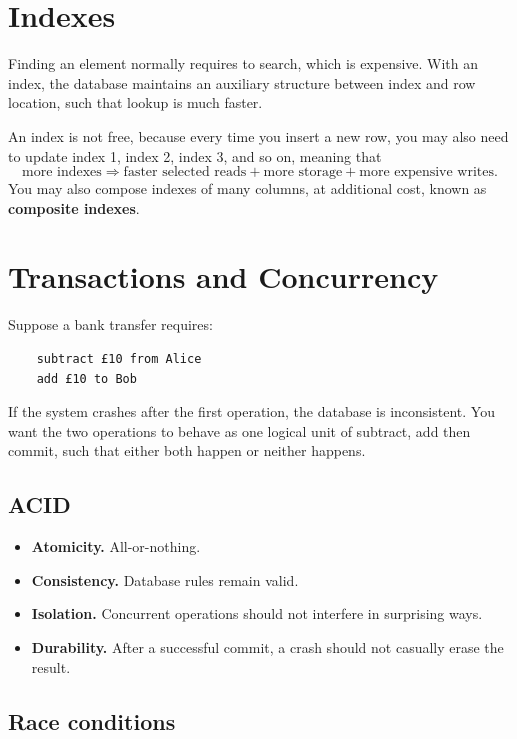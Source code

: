 \section{Indexes}
\label{sec:database-indexes}

Finding an element normally requires to search, which is expensive.
With an index, the database maintains an auxiliary structure between index and row location, such that lookup is much faster.

An index is not free, because every time you insert a new row, you may also need to update index 1, index 2, index 3, and so on, meaning that
\[
\text{more indexes}
\Rightarrow
\text{faster selected reads}
+
\text{more storage}
+
\text{more expensive writes}
.
\]
You may also compose indexes of many columns, at additional cost, known as \textbf{composite indexes}.

\section{Transactions and Concurrency}
\label{sec:transactions-concurrency}
Suppose a bank transfer requires:
\begin{verbatim}
    subtract £10 from Alice
    add £10 to Bob
\end{verbatim}
If the system crashes after the first operation, the database is inconsistent.
You want the two operations to behave as one logical unit of subtract, add then commit, such that either both happen or neither happens.

\subsection{ACID}
\begin{itemize}
    \item \textbf{Atomicity.} All-or-nothing.
    \item \textbf{Consistency.} Database rules remain valid.
    \item \textbf{Isolation.} Concurrent operations should not interfere in surprising ways.
    \item \textbf{Durability.} After a successful commit, a crash should not casually erase the result.
\end{itemize}

\subsection{Race conditions}

